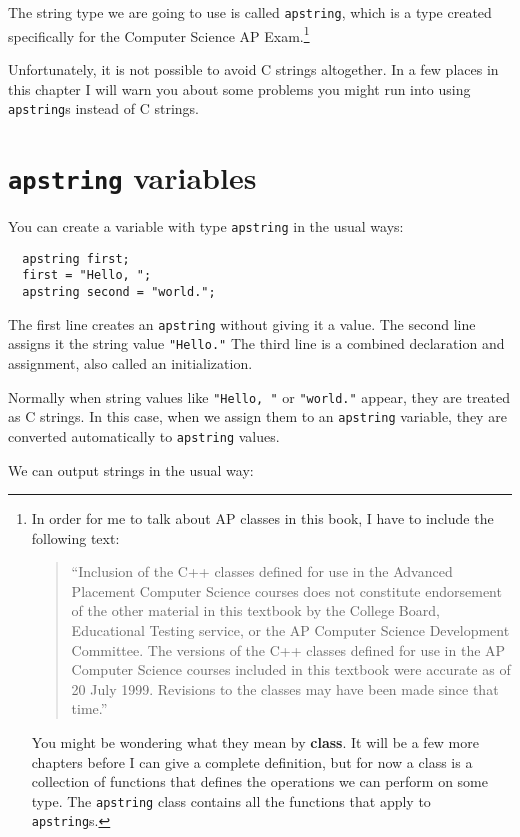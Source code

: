 The string type we are going to use is called {\tt apstring}, which is
a type created specifically for the Computer Science AP
Exam.\footnote{In order for me to talk about AP classes in this book,
I have to include the following text:

\begin{quotation}
``Inclusion of the C++ classes defined for use in the Advanced
Placement Computer Science courses does not constitute endorsement of
the other material in this textbook by the College Board, Educational
Testing service, or the AP Computer Science Development Committee. The
versions of the C++ classes defined for use in the AP Computer Science
courses included in this textbook were accurate as of 20 July
1999.  Revisions to the classes may have been made since that time.''
\end{quotation}

You might be wondering what they mean by {\bf class}.  It will be a few
more chapters before I can give a complete definition, but for now a
class is a collection of functions that defines the operations we
can perform on some type.  The {\tt apstring} class contains all
the functions that apply to {\tt apstring}s.}

Unfortunately, it is not possible to avoid C strings altogether.
In a few places in this chapter I will warn you about some problems
you might run into using {\tt apstring}s instead of C strings.

\section{{\tt apstring} variables}

You can create a variable with type {\tt apstring} in the usual
ways:

\begin{verbatim}
  apstring first;
  first = "Hello, ";
  apstring second = "world.";
\end{verbatim}
%
The first line creates an {\tt apstring} without giving it a value.
The second line assigns it the string value {\tt "Hello."}
The third line is a combined declaration and assignment, also
called an initialization.

Normally when string values like {\tt "Hello, "} or {\tt "world."}
appear, they are treated as C strings.  In this case, when we assign
them to an {\tt apstring} variable, they are converted automatically
to {\tt apstring} values.

We can output strings in the usual way:

